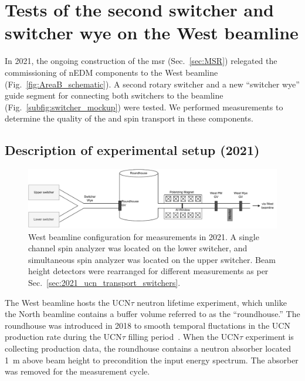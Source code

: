 
\chapter{Tests of the second switcher and switcher wye on the West beamline}\label{chap:fall2021}


In 2021, the ongoing construction of the \acrshort{msr} (Sec.~\ref{sec:MSR}) relegated the commissioning of nEDM components to the West beamline (Fig.~\ref{fig:AreaB_schematic}). A second rotary switcher and a new ``switcher wye'' guide segment for connecting both switchers to the beamline (Fig.~\ref{subfig:switcher_mockup}) were tested. We performed measurements to determine the quality of the \ucn and \ucn spin transport in these components.


\section{Description of experimental setup (2021)}\label{sec:2021_experimental_setup}


\begin{figure}[h]
    \centering
    \includegraphics[width=\textwidth]{figures/westbeamline_2021.pdf}
    \caption[West beamline configuration for measurements in 2021.]
    {West beamline configuration for measurements in 2021. A single channel spin analyzer was located on the lower switcher, and simultaneous spin analyzer was located on the upper switcher. Beam height detectors were rearranged for different measurements as per Sec.~\ref{sec:2021_ucn_transport_switchers}.}\label{fig:west_beamline_2021}
\end{figure}

The West beamline hosts the UCN$\tau$ neutron lifetime experiment, which unlike the North beamline contains a buffer volume referred to as the ``roundhouse.'' The roundhouse was introduced in 2018 to smooth temporal fluctations in the UCN production rate during the UCN$\tau$ filling period~\cite{gonzalez_ucn_tau}. When the UCN$\tau$ experiment is collecting production data, the roundhouse contains a neutron absorber located \qty{1}{m} above beam height to precondition the input \ucn energy spectrum. The absorber was removed for the measurement cycle. 

